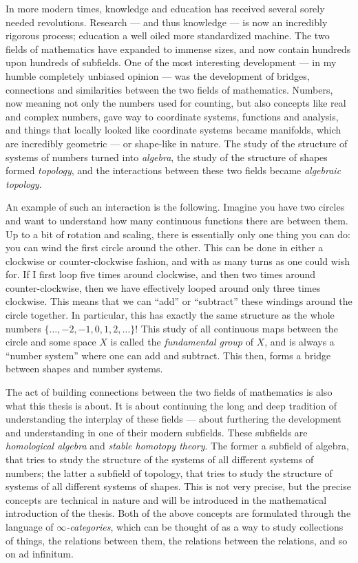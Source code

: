 In more modern times, knowledge and education has received several sorely needed revolutions. Research --- and thus knowledge --- is now an incredibly rigorous process; education a well oiled more standardized machine. The two fields of mathematics have expanded to immense sizes, and now contain hundreds upon hundreds of subfields. One of the most interesting development --- in my humble completely unbiased opinion --- was the development of bridges, connections and similarities between the two fields of mathematics. Numbers, now meaning not only the numbers used for counting, but also concepts like real and complex numbers, gave way to coordinate systems, functions and analysis, and things that locally looked like coordinate systems became manifolds, which are incredibly geometric --- or shape-like in nature. The study of the structure of systems of numbers turned into \emph{algebra}, the study of the structure of shapes formed \emph{topology}, and the interactions between these two fields became \emph{algebraic topology}. 

An example of such an interaction is the following. Imagine you have two circles and want to understand how many continuous functions there are between them. Up to a bit of rotation and scaling, there is essentially only one thing you can do: you can wind the first circle around the other. This can be done in either a clockwise or counter-clockwise fashion, and with as many turns as one could wish for. If I first loop five times around clockwise, and then two times around counter-clockwise, then we have effectively looped around only three times clockwise. This means that we can ``add'' or ``subtract'' these windings around the circle together. In particular, this has exactly the same structure as the whole numbers $\{\ldots,-2, -1, 0, 1, 2,\ldots\}$! This study of all continuous maps between the circle and some space $X$ is called the \emph{fundamental group} of $X$, and is always a ``number system'' where one can add and subtract. This then, forms a bridge between shapes and number systems. 

The act of building connections between the two fields of mathematics is also what this thesis is about. It is about continuing the long and deep tradition of understanding the interplay of these fields --- about furthering the development and understanding in one of their modern subfields. These subfields are \emph{homological algebra} and \emph{stable homotopy theory}. The former a subfield of algebra, that tries to study the structure of the systems of all different systems of numbers; the latter a subfield of topology, that tries to study the structure of systems of all different systems of shapes. This is not very precise, but the precise concepts are technical in nature and will be introduced in the mathematical introduction of the thesis. Both of the above concepts are formulated through the language of \emph{$\infty$-categories}, which can be thought of as a way to study collections of things, the relations between them, the relations between the relations, and so on ad infinitum. 

